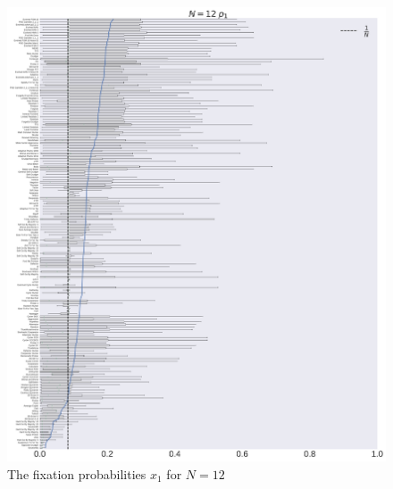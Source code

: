 \documentclass[10pt,letterpaper]{article}
\begin{document}
\begin{figure}[!hbtp]
    \centering
    \includegraphics[width=\textwidth]{./boxplot_12_invade.pdf}
    \caption{The fixation probabilities \(x_1\) for \(N=12\)}
\end{figure}
\end{document}

